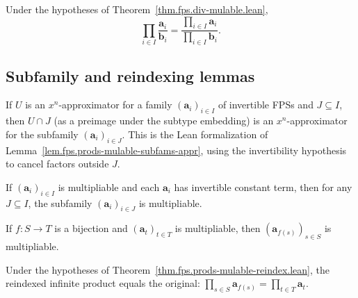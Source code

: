 \begin{theorem}
\label{thm.fps.div-mulable-eq.lean}
\leanhelper
\leanok
Under the hypotheses of Theorem~\ref{thm.fps.div-mulable.lean},
\[
\prod_{i \in I} \frac{\mathbf{a}_i}{\mathbf{b}_i}
= \frac{\prod_{i \in I} \mathbf{a}_i}{\prod_{i \in I} \mathbf{b}_i}.
\]
\end{theorem}

\subsection{Subfamily and reindexing lemmas}

\begin{lemma}
\label{lem.fps.infprod.approx-inter-subfamily}
\leanhelper
\leanok
If $U$ is an $x^n$-approximator for a family $(\mathbf{a}_i)_{i \in I}$ of
invertible FPSs and $J \subseteq I$, then $U \cap J$ (as a preimage under the
subtype embedding) is an $x^n$-approximator for the subfamily
$(\mathbf{a}_i)_{i \in J}$.
This is the Lean formalization of Lemma~\ref{lem.fps.prods-mulable-subfams-appr},
using the invertibility hypothesis to cancel factors outside $J$.
\end{lemma}

\begin{theorem}
\label{thm.fps.prods-mulable-subfams.lean}
\leanhelper
\leanok
If $(\mathbf{a}_i)_{i \in I}$ is multipliable and each $\mathbf{a}_i$ has invertible
constant term, then for any $J \subseteq I$, the subfamily $(\mathbf{a}_i)_{i \in J}$
is multipliable.
\end{theorem}

\begin{theorem}
\label{thm.fps.prods-mulable-reindex.lean}
\leanhelper
\leanok
If $f : S \to T$ is a bijection and $(\mathbf{a}_t)_{t \in T}$ is multipliable,
then $(\mathbf{a}_{f(s)})_{s \in S}$ is multipliable.
\end{theorem}

\begin{theorem}
\label{thm.fps.prods-mulable-reindex-eq.lean}
\leanhelper
\leanok
Under the hypotheses of Theorem~\ref{thm.fps.prods-mulable-reindex.lean},
the reindexed infinite product equals the original:
$\prod_{s \in S} \mathbf{a}_{f(s)} = \prod_{t \in T} \mathbf{a}_t$.
\end{theorem}

